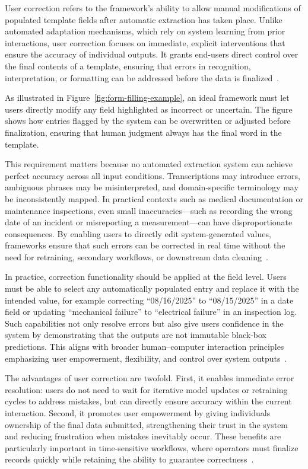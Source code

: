 User correction refers to the framework’s ability to allow manual modifications of populated template fields after automatic extraction has taken place. Unlike automated adaptation mechanisms, which rely on system learning from prior interactions, user correction focuses on immediate, explicit interventions that ensure the accuracy of individual outputs. It grants end-users direct control over the final contents of a template, ensuring that errors in recognition, interpretation, or formatting can be addressed before the data is finalized~\cite{bohus2005sorry, shneiderman2016designing}.  

As illustrated in Figure~\ref{fig:form-filling-example}, an ideal framework must let users directly modify any field highlighted as incorrect or uncertain. The figure shows how entries flagged by the system can be overwritten or adjusted before finalization, ensuring that human judgment always has the final word in the template.

This requirement matters because no automated extraction system can achieve perfect accuracy across all input conditions. Transcriptions may introduce errors, ambiguous phrases may be misinterpreted, and domain-specific terminology may be inconsistently mapped. In practical contexts such as medical documentation or maintenance inspections, even small inaccuracies—such as recording the wrong date of an incident or misreporting a measurement—can have disproportionate consequences. By enabling users to directly edit system-generated values, frameworks ensure that such errors can be corrected in real time without the need for retraining, secondary workflows, or downstream data cleaning~\cite{norman2013design}.  

In practice, correction functionality should be applied at the field level. Users must be able to select any automatically populated entry and replace it with the intended value, for example correcting “08/16/2025” to “08/15/2025” in a date field or updating “mechanical failure” to “electrical failure” in an inspection log. Such capabilities not only resolve errors but also give users confidence in the system by demonstrating that the outputs are not immutable black-box predictions. This aligns with broader human–computer interaction principles emphasizing user empowerment, flexibility, and control over system outputs~\cite{shneiderman2016designing, hoy2018voice}.  

The advantages of user correction are twofold. First, it enables immediate error resolution: users do not need to wait for iterative model updates or retraining cycles to address mistakes, but can directly ensure accuracy within the current interaction. Second, it promotes user empowerment by giving individuals ownership of the final data submitted, strengthening their trust in the system and reducing frustration when mistakes inevitably occur. These benefits are particularly important in time-sensitive workflows, where operators must finalize records quickly while retaining the ability to guarantee correctness~\cite{amershi2019guidelines}.


